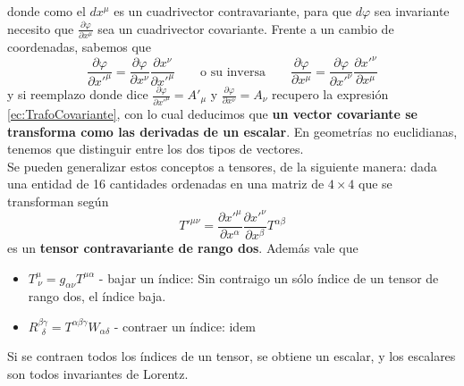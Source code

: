 donde como el $dx^{\mu}$ es un cuadrivector contravariante, para que $d\varphi$ sea invariante necesito que $\frac{\partial \varphi}{\partial x^{\mu}}$ sea un cuadrivector covariante. Frente a un cambio de coordenadas, sabemos que
\begin{equation*}
    \frac{\partial \varphi}{\partial x'^{\mu}} 
    = \frac{\partial \varphi}{\partial x^{\nu}}
    \frac{\partial x^{\nu}}{\partial x'^{\mu}}
    \quad
    \quad
    \mbox{o su inversa}
    \quad
    \quad
    \frac{\partial \varphi}{\partial x^{\mu}} 
    = \frac{\partial \varphi}{\partial x'^{\nu}}
    \frac{\partial x'^{\nu}}{\partial x^{\mu}}
\end{equation*}
y si reemplazo donde dice $\frac{\partial \varphi}{\partial x'^{\mu}} = A'_{\mu}$ y $\frac{\partial \varphi}{\partial x^{\nu}} = A_{\nu}$ recupero la expresión \eqref{ec:TrafoCovariante}, con lo cual deducimos que \textbf{un vector covariante se transforma como las derivadas de un escalar}. En geometrías no euclidianas, tenemos que distinguir entre los dos tipos de vectores.\\
\indent Se pueden generalizar estos conceptos a tensores, de la siguiente manera: dada una entidad de 16 cantidades ordenadas en una matriz de $4 \times 4$ que se transforman según
\begin{equation*}
    T'^{\mu\nu} = 
    \frac{\partial x'^{\mu}}{\partial x^{\alpha}}
    \frac{\partial x'^{\nu}}{\partial x^{\beta}}T^{\alpha\beta}
\end{equation*}
es un \textbf{tensor contravariante de rango dos}. Además vale que
\begin{itemize}
    \item $T^{\mu}_{~\nu} = g_{\alpha\nu}T^{\mu\alpha}$ - bajar un índice: Sin contraigo un sólo índice de un tensor de rango dos, el índice baja.
    \item $R^{\beta\gamma}_{~~\delta} = T^{\alpha\beta\gamma}W_{\alpha\delta}$ - contraer un índice: idem
\end{itemize}
Si se contraen todos los índices de un tensor, se obtiene un escalar, y los escalares son todos invariantes de Lorentz.




